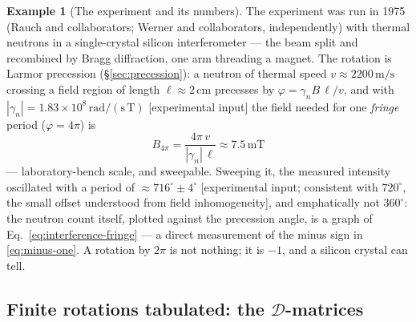 \documentclass[11pt]{article}
\theoremstyle{plain}
\theoremstyle{definition}
\newtheorem{example}[theorem]{Example}
\theoremstyle{remark}
\begin{document}
\begin{example}[The experiment and its numbers]
\label{ex:neutron-interferometry}
The experiment was run in 1975 (Rauch and collaborators; Werner and
collaborators, independently) with thermal neutrons in a
single-crystal silicon interferometer --- the beam split and
recombined by Bragg diffraction, one arm threading a magnet. The
rotation is Larmor precession (\S\ref{sec:precession}): a neutron
of thermal speed $v \approx 2200\,\mathrm{m/s}$ crossing a field
region of length $\ell \approx 2\,\mathrm{cm}$ precesses by
$\varphi = \gamma_n B\,\ell/v$, and with
$|\gamma_n| = 1.83\times10^{8}\,\mathrm{rad/(s\,T)}$ [experimental
input] the field
needed for one \emph{fringe} period ($\varphi = 4\pi$) is
\begin{equation}
  B_{4\pi}
  = \frac{4\pi\, v}{|\gamma_n|\,\ell}
  \approx 7.5\,\mathrm{mT}
\end{equation}
--- laboratory-bench scale, and sweepable. Sweeping it, the
measured intensity oscillated with a period of
$\approx 716^\circ \pm 4^\circ$ [experimental input; consistent
with $720^\circ$, the small offset understood from field
inhomogeneity], and emphatically not $360^\circ$: the neutron
count itself, plotted against the precession angle, is a graph of
Eq.~\eqref{eq:interference-fringe} --- a direct measurement of the
minus sign in \eqref{eq:minus-one}. A rotation by $2\pi$ is
not nothing; it is $-1$, and a silicon crystal can tell.
\end{example}

\subsection{Finite rotations tabulated: the $\mathscr D$-matrices}
\label{sec:D-functions}
\end{document}
